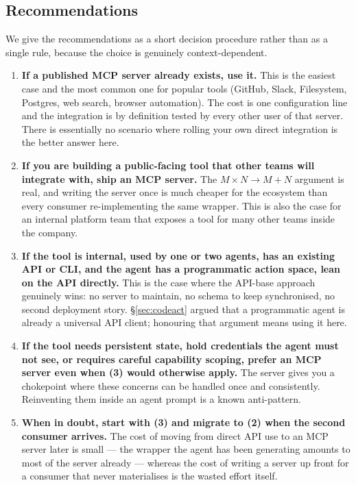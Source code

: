 \subsection{Recommendations}
\label{sec:mcp-recs}

We give the recommendations as a short decision procedure rather
than as a single rule, because the choice is genuinely
context-dependent.

\begin{enumerate}[label=\textbf{(\arabic*)},leftmargin=2.2em,itemsep=0.5em]

\item \textbf{If a published MCP server already exists, use it.}
  This is the easiest case and the most common one for popular
  tools (GitHub, Slack, Filesystem, Postgres, web search, browser
  automation). The cost is one configuration line and the
  integration is by definition tested by every other user of that
  server. There is essentially no scenario where rolling your own
  direct integration is the better answer here.

\item \textbf{If you are building a public-facing tool that other
  teams will integrate with, ship an MCP server.} The
  $M \times N \to M + N$ argument is real, and writing the server
  once is much cheaper for the ecosystem than every consumer
  re-implementing the same wrapper. This is also the case for an
  internal platform team that exposes a tool for many other teams
  inside the company.

\item \textbf{If the tool is internal, used by one or two agents,
  has an existing API or CLI, and the agent has a programmatic
  action space, lean on the API directly.} This is the case where
  the API-base approach genuinely wins: no server to maintain, no
  schema to keep synchronised, no second deployment story.
  \S\ref{sec:codeact} argued that a programmatic agent is already
  a universal API client; honouring that argument means using it
  here.

\item \textbf{If the tool needs persistent state, hold credentials
  the agent must not see, or requires careful capability scoping,
  prefer an MCP server even when (3) would otherwise apply.} The
  server gives you a chokepoint where these concerns can be
  handled once and consistently. Reinventing them inside an agent
  prompt is a known anti-pattern.

\item \textbf{When in doubt, start with (3) and migrate to (2)
  when the second consumer arrives.} The cost of moving from
  direct API use to an MCP server later is small --- the wrapper
  the agent has been generating amounts to most of the server
  already --- whereas the cost of writing a server up front for a
  consumer that never materialises is the wasted effort itself.

\end{enumerate}

